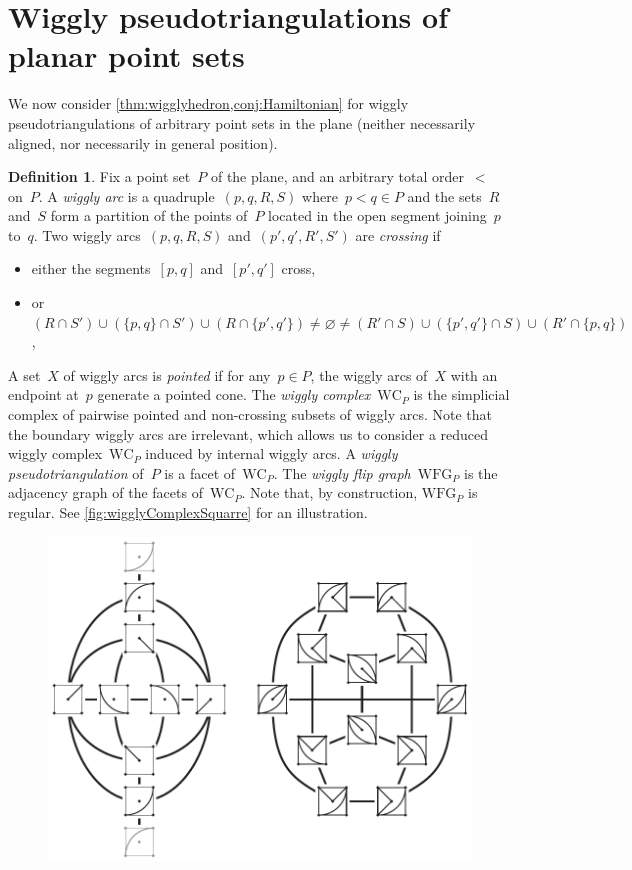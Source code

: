 \documentclass{amsart}
\theoremstyle{definition}
\newtheorem{definition}[theorem]{Definition}
\newcommand{\darkblue}{\color{darkblue}} %
\newcommand{\defn}[1]{\textsl{\darkblue #1}} %
\newcommand{\wigglyComplex}{\mathrm{WC}} %
\newcommand{\wigglyFlipGraph}{\mathrm{WFG}} %
\begin{document}

\section{Wiggly pseudotriangulations of planar point sets}

We now consider \cref{thm:wigglyhedron,conj:Hamiltonian} for wiggly pseudotriangulations of arbitrary point sets in the plane (neither necessarily aligned, nor necessarily in general position).

\begin{definition}
Fix a point set~$P$ of the plane, and an arbitrary total order~$<$ on~$P$.
A \defn{wiggly arc} is a quadruple~$(p,q,R,S)$ where~$p < q \in P$ and the sets~$R$ and~$S$ form a partition of the points of~$P$ located in the open segment joining~$p$ to~$q$.
Two wiggly arcs~$(p,q,R,S)$ and~$(p',q',R',S')$ are \defn{crossing} if 
\begin{itemize}
\item either the segments~$[p,q]$ and~$[p',q']$ cross, 
\item or~$(R \cap S') \cup (\{p,q\} \cap S') \cup (R \cap \{p',q'\}) \ne \varnothing \ne (R' \cap S) \cup (\{p',q'\} \cap S) \cup (R' \cap \{p,q\})$,
\end{itemize}
A set~$X$ of wiggly arcs is \defn{pointed} if for any~$p \in P$, the wiggly arcs of~$X$ with an endpoint at~$p$ generate a pointed cone.
The \defn{wiggly complex}~$\wigglyComplex_P$ is the simplicial complex of pairwise pointed and non-crossing subsets of wiggly arcs.
Note that the boundary wiggly arcs are irrelevant, which allows us to consider a reduced wiggly complex~$\wigglyComplex_P$ induced by internal wiggly arcs.
A \defn{wiggly pseudotriangulation} of~$P$ is a facet of~$\wigglyComplex_P$.
The \defn{wiggly flip graph}~$\wigglyFlipGraph_P$ is the adjacency graph of the facets of~$\wigglyComplex_P$.
Note that, by construction, $\wigglyFlipGraph_P$ is regular.
See \cref{fig:wigglyComplexSquarre} for an illustration.
%
\begin{figure}[!h]
\centerline{\includegraphics[scale=1]{wigglyComplexSquare}}

\end{figure}
\end{definition}
\end{document}
